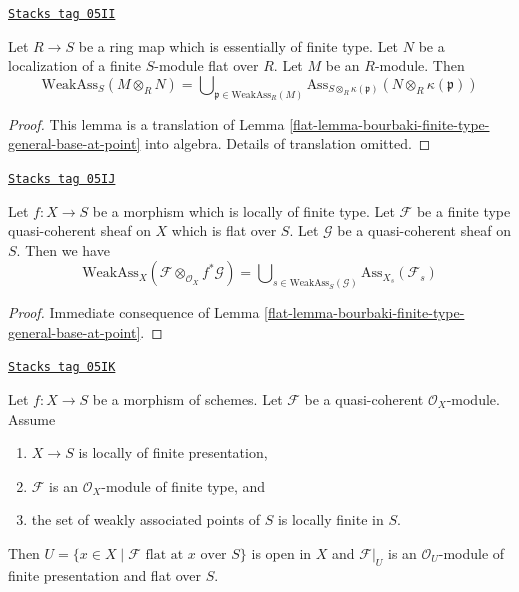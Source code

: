 \begin{lemma}
\label{flat-lemma-weak-bourbaki}
\href{https://stacks.math.columbia.edu/tag/05II}{\texttt{Stacks tag 05II}}

Let $R \to S$ be a ring map which is essentially of finite type.
Let $N$ be a localization of a finite $S$-module flat over $R$.
Let $M$ be an $R$-module. Then
$$
\text{WeakAss}_S(M \otimes_R N)
=
\bigcup\nolimits_{\mathfrak p \in \text{WeakAss}_R(M)}
\text{Ass}_{S \otimes_R \kappa(\mathfrak p)}(N \otimes_R \kappa(\mathfrak p))
$$
\end{lemma}

\begin{proof}

This lemma is a translation of
Lemma \ref{flat-lemma-bourbaki-finite-type-general-base-at-point}
into algebra. Details of translation omitted.
\end{proof}

\begin{lemma}
\label{flat-lemma-bourbaki-finite-type-general-base}
\href{https://stacks.math.columbia.edu/tag/05IJ}{\texttt{Stacks tag 05IJ}}

Let $f : X \to S$ be a morphism which is locally of finite type.
Let $\mathcal{F}$ be a finite type quasi-coherent sheaf on $X$
which is flat over $S$. Let $\mathcal{G}$ be a quasi-coherent sheaf on $S$.
Then we have
$$
\text{WeakAss}_X(\mathcal{F} \otimes_{\mathcal{O}_X} f^*\mathcal{G}) =
\bigcup\nolimits_{s \in \text{WeakAss}_S(\mathcal{G})}
\text{Ass}_{X_s}(\mathcal{F}_s)
$$
\end{lemma}

\begin{proof}

Immediate consequence of
Lemma \ref{flat-lemma-bourbaki-finite-type-general-base-at-point}.
\end{proof}

\begin{theorem}
\label{flat-theorem-finite-type-flat}
\href{https://stacks.math.columbia.edu/tag/05IK}{\texttt{Stacks tag 05IK}}


Let $f : X \to S$ be a morphism of schemes.
Let $\mathcal{F}$ be a quasi-coherent $\mathcal{O}_X$-module.
Assume
\begin{enumerate}
\item $X \to S$ is locally of finite presentation,
\item $\mathcal{F}$ is an $\mathcal{O}_X$-module of finite type, and
\item the set of weakly associated points of $S$ is locally finite in $S$.
\end{enumerate}
Then $U = \{x \in X \mid \mathcal{F}\text{ flat at }x\text{ over }S\}$
is open in $X$ and $\mathcal{F}|_U$ is an $\mathcal{O}_U$-module
of finite presentation and flat over $S$.
\end{theorem}

